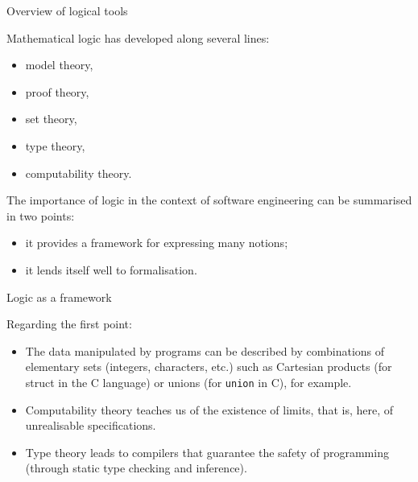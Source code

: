 \documentclass[compress,dvips,xcolor={dvipsnames},t]{beamer}
\begin{document}
%
\begin{frame}{Overview of logical tools}

Mathematical logic has developed along several lines:
\begin{itemize}

  \item model theory,

  \item proof theory,

  \item set theory,

  \item type theory,

  \item computability theory.

\end{itemize}
The importance of logic in the context of software engineering can
be summarised in two points:
\begin{itemize}

  \item it provides a framework for expressing many notions;

  \item it lends itself well to formalisation.

\end{itemize}

\end{frame}

%
\begin{frame}{Logic as a framework}

Regarding the first point:
\begin{itemize}

  \item The data manipulated by programs can be described by
    combinations of elementary sets (integers, characters, etc.) such
    as Cartesian products (for \texttt\small {struct} in the
    \textsf{C} language) or unions (for \texttt{\small union} in
    \textsf{C}), for example.

  \item Computability theory teaches us of the existence of limits,
  that is, here, of unrealisable specifications.

  \item Type theory leads to compilers that guarantee the safety of
  programming (through static type checking and inference).

\end{itemize}

\end{frame}
\end{document}
